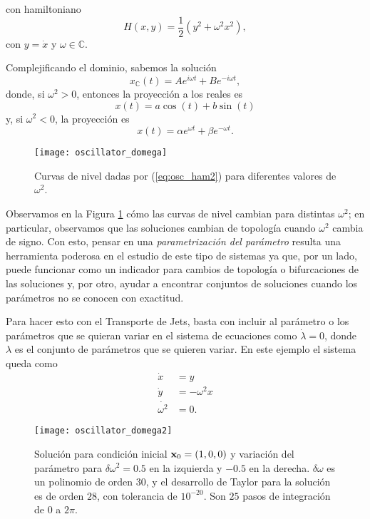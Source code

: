 con hamiltoniano
\begin{equation}
 H(x,y) = \frac{1}{2} \left( y^2 + \omega ^2 x^2 \right),
 \label{eq:osc_ham2}
\end{equation}
con $y = \dot{x}$ y $\omega \in \mathbb{C}$.

Complejificando el dominio, sabemos la solución
\begin{equation*}
 x_{\mathbb{C}}(t) = A e^{i\omega t} + B e^{-i \omega t},
\end{equation*}
donde, si $\omega^2 > 0$, entonces la proyección a los reales es
\begin{equation}
 x(t) = a \cos(t) + b \sin (t)
 \label{eq:ho_solution_trig}
\end{equation}
y, si $\omega^2 < 0$, la proyección es
\begin{equation}
 x(t) = \alpha e^{\omega t} + \beta e^{- \omega t}.
 \label{eq:ho_solution_exp}
\end{equation}

\begin{figure}[h!]
 \centering
 \texttt{[image: oscillator\_domega]}
 \caption{Curvas de nivel dadas por (\ref{eq:osc_ham2}) para diferentes valores de $\omega^2$.}
 \label{fig:oscillator_domega}
\end{figure}

Observamos en la Figura \ref{fig:oscillator_domega} cómo las curvas de nivel cambian para distintas $\omega^2$; en particular, observamos que las soluciones cambian de topología cuando $\omega^2$ cambia de signo. Con esto, pensar en una \textit{parametrización del parámetro} resulta una herramienta poderosa en el estudio de este tipo de sistemas ya que, por un lado, puede funcionar como un indicador para cambios de topología o bifurcaciones de las soluciones y, por otro, ayudar a encontrar conjuntos de soluciones cuando los parámetros no se conocen con exactitud. 

Para hacer esto con el Transporte de Jets, basta con incluir al parámetro o los parámetros que se quieran variar en el sistema de ecuaciones como $\dot{\lambda} = 0$, donde $\lambda$ es el conjunto de parámetros que se quieren variar. En este ejemplo el sistema queda como
\begin{align*}
 \dot{x} &= y \\
 \dot{y} &= - \omega^2 x \\
 \dot{\omega^2} &= 0.
\end{align*}
 
\begin{figure}[h!]
 \centering 
 \texttt{[image: oscillator\_domega2]}
 \caption{Solución para condición inicial $\mathbf{x}_0 = (1,0,0)$ y variación del parámetro para $\delta \omega^2 = 0.5$ en la izquierda y $-0.5$ en la derecha. $\delta \omega$ es un polinomio de orden $30$, y el desarrollo de Taylor para la solución es de orden $28$, con tolerancia de $10^{-20}$. Son $25$ pasos de integración de $0$ a $2 \pi$.}
 \label{fig:oscillator_param_transport}
\end{figure}

